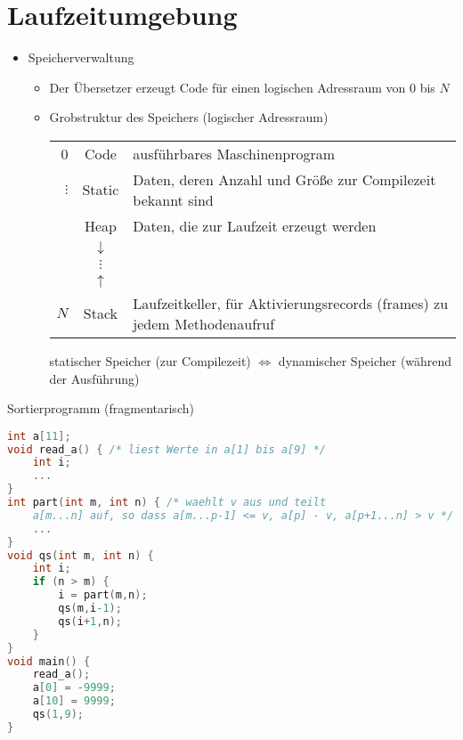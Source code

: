 \chapter{Laufzeitumgebung}
\begin{itemize}
 \item Speicherverwaltung
     \begin{itemize}
     \item Der Übersetzer erzeugt Code für einen logischen Adressraum von $0$ bis $N$
     \item Grobstruktur des Speichers (logischer Adressraum)
        \begin{center}
        \begin{tabular}{r|c|l}\cline{2-2}
               0 & Code & ausführbares Maschinenprogram\\\cline{2-2}
        $\vdots$ & Static & Daten, deren Anzahl und Größe zur Compilezeit bekannt sind \\\cline{2-2}
         & Heap & Daten, die zur Laufzeit erzeugt werden \\\cline{2-2}
         & $\downarrow$ & \\
         & $\vdots$ & \\
         & $\uparrow$ & \\\cline{2-2}
        $N$ & Stack & Laufzeitkeller, für Aktivierungsrecords (frames) zu jedem Methodenaufruf \\\cline{2-2}
        \end{tabular}
        \end{center}
        \begin{center}
         statischer Speicher (zur Compilezeit) $\Leftrightarrow$ dynamischer Speicher (während der Ausführung)
        \end{center}
     \end{itemize}
\end{itemize}
\Bsp Sortierprogramm (fragmentarisch)
\begin{lstlisting}[language=C]
int a[11];
void read_a() { /* liest Werte in a[1] bis a[9] */
    int i;
    ...
}
int part(int m, int n) { /* waehlt v aus und teilt 
    a[m...n] auf, so dass a[m...p-1] <= v, a[p] - v, a[p+1...n] > v */
    ...
}
void qs(int m, int n) {
    int i;
    if (n > m) {
        i = part(m,n);
        qs(m,i-1);
        qs(i+1,n);
    }
}
void main() {
    read_a();
    a[0] = -9999;
    a[10] = 9999;
    qs(1,9);
}
\end{lstlisting}

